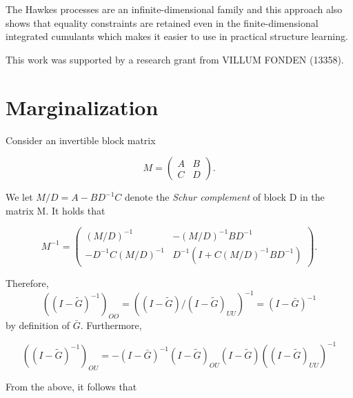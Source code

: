 \documentclass[accepted]{uai2021} %
\begin{document}
The Hawkes processes are an infinite-dimensional family and this approach also 
shows that equality constraints are retained even in the finite-dimensional 
integrated cumulants which makes it easier to use in practical structure 
learning.




\begin{contributions} %

\end{contributions}

\begin{acknowledgements} %
    This work was supported by a research grant from
    VILLUM FONDEN (13358).
\end{acknowledgements}

\appendix

\section{Marginalization}
\label{sec:marg}

Consider an invertible block matrix 

$$
M=
\begin{pmatrix}
A & B \\
C & D
\end{pmatrix}.
$$

We let $M / D = A - BD^{-1}C$ denote the \emph{Schur complement} of block D in 
the matrix M. It holds that

$$
M^{-1}=
\begin{pmatrix}
(M/D)^{-1} & -(M/D)^{-1}BD^{-1} \\
-D^{-1}C(M/D)^{-1} & D^{-1}(I + C(M/D)^{-1}BD^{-1})
\end{pmatrix}.
$$

Therefore, $$((I - \tilde{G})^{-1})_{OO} = ((I - \tilde{G})/(I - 
\tilde{G})_{UU})^{-1} = (I- \bar{G})^{-1}$$ by definition of $\bar{G}$. 
Furthermore, 

$$
((I-\tilde{G})^{-1})_{OU} = 
-(I-\bar{G})^{-1}(I-\tilde{G})_{OU}(I-\tilde{G})((I-\tilde{G})_{UU})^{-1}
$$

From the above, it follows that
\end{document}
